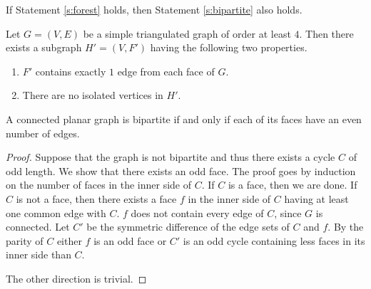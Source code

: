 \begin{remark}
  If Statement \ref{s:forest} holds, then Statement \ref{s:bipartite} also holds.
\end{remark}

\begin{guess}\label{s:no_iso}
  Let $G = (V, E)$ be a simple triangulated graph of order at least $4$. Then there
  exists a subgraph $H' = (V, F')$ having the following two properties.
  \begin{enumerate}
    \item $F'$ contains exactly $1$ edge from each face of $G$.
    \item There are no isolated vertices in $H'$.
  \end{enumerate}
\end{guess}

\begin{lemma}\label{l:bipartite}
  A connected planar graph is bipartite if and only if each of its faces have an
  even number of edges.
\end{lemma}
\begin{proof}
  Suppose that the graph is not bipartite and thus there exists a cycle $C$ of odd
  length. We show that there exists an odd face. The proof goes by induction on the
  number of faces in the inner side of $C$. If $C$ is a face, then we are done.
  If $C$ is not a face, then there exists a face $f$ in the inner side of $C$ having at least one
  common edge with $C$. $f$ does not contain every edge of $C$, since $G$ is connected.
  Let $C'$ be the symmetric difference of the edge sets of $C$ and $f$. By the parity of $C$
  either $f$ is an odd face or $C'$ is an odd cycle containing less faces in its
  inner side than $C$.

  The other direction is trivial.
\end{proof}

